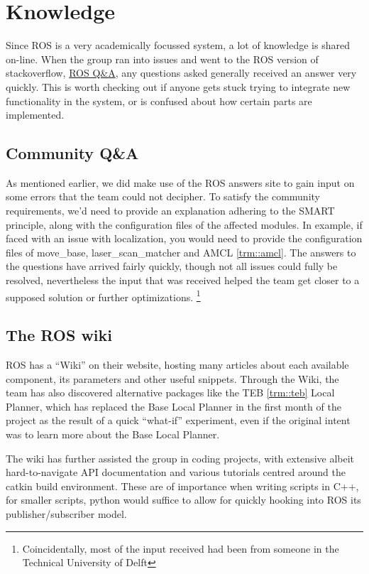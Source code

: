 \section{Knowledge}
Since ROS is a very academically focussed system, a lot of knowledge is shared on-line.
When the group ran into issues and went to the ROS version of stackoverflow, \href{https://answers.ros.org/questions/}{ROS Q&A}, any questions asked generally received an answer very quickly.
This is worth checking out if anyone gets stuck trying to integrate new functionality in the system, or is confused about how certain parts are implemented.

\subsection{Community Q\&A}
As mentioned earlier, we did make use of the ROS answers site to gain input on some errors that the team could not decipher. 
To satisfy the community requirements, we'd need to provide an explanation adhering to the SMART principle, along with the configuration files of the affected modules.
In example, if faced with an issue with localization, you would need to provide the configuration files of move\_base, laser\_scan\_matcher and AMCL \ref{trm::amcl}.
The answers to the questions have arrived fairly quickly, though not all issues could fully be resolved, nevertheless the input that was  received helped the team get closer to a supposed solution or further optimizations. 
\footnote{Coincidentally, most of the input received had been from someone in the Technical University of Delft}


\subsection{The ROS wiki}
ROS has a ``Wiki'' \cite{roswiki} on their website, hosting many articles about each available component, its parameters and other useful snippets. 
Through the Wiki, the team has also discovered alternative packages like the TEB \ref{trm::teb} Local Planner, which has replaced the Base Local Planner in the first month of the project as the result of a quick  ``what-if'' experiment, even if the original intent was to learn more about the Base Local Planner.

The wiki has further assisted the group in coding projects, with extensive albeit hard-to-navigate API documentation and various tutorials centred around the catkin build environment. 
These are of importance when writing scripts in C++, for smaller scripts, python would suffice to allow for quickly hooking into ROS its publisher/subscriber model.

\newpage
